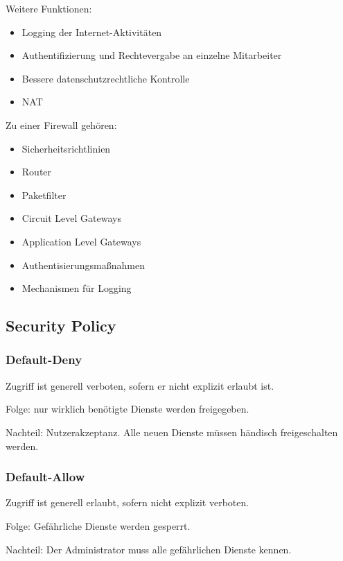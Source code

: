 \vspace{.3cm}

Weitere Funktionen:
\begin{itemize}
    \item Logging der Internet-Aktivitäten
    \item Authentifizierung und Rechtevergabe an einzelne Mitarbeiter
    \item Bessere datenschutzrechtliche Kontrolle
    \item NAT
\end{itemize}

\vspace{.3cm}

Zu einer Firewall gehören:
\begin{itemize}
    \item Sicherheitsrichtlinien
    \item Router
    \item Paketfilter
    \item Circuit Level Gateways
    \item Application Level Gateways
    \item Authentisierungsmaßnahmen
    \item Mechanismen für Logging
\end{itemize}

\subsection{Security Policy}

\subsubsection{Default-Deny}
Zugriff ist generell verboten, sofern er nicht explizit erlaubt ist.

Folge: nur wirklich benötigte Dienste werden freigegeben.

Nachteil: Nutzerakzeptanz. Alle neuen Dienste müssen händisch freigeschalten werden.

\subsubsection{Default-Allow}
Zugriff ist generell erlaubt, sofern nicht explizit verboten.

Folge: Gefährliche Dienste werden gesperrt.

Nachteil: Der Administrator muss alle gefährlichen Dienste kennen.

